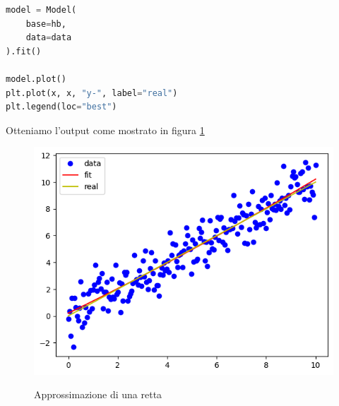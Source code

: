 \documentclass[../main.tex]{subfiles}
\begin{document}
\begin{lstlisting}[language=Python,caption={Plot dei risultati}]
model = Model(
    base=hb,
    data=data
).fit()

model.plot()
plt.plot(x, x, "y-", label="real")
plt.legend(loc="best")
\end{lstlisting}
Otteniamo l'output come mostrato in figura \ref{fig:retta_fit}
\begin{figure}
    \caption{Approssimazione di una retta}
    \includegraphics{Immagini/esempi/retta.png}
    \centering
    \label{fig:retta_fit}
\end{figure}
\end{document}

